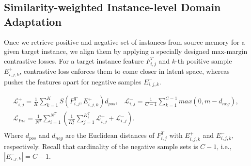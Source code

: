 \documentclass{bmvc2k}
\begin{document}
\subsection{Similarity-weighted Instance-level Domain Adaptation} \label{sec:alignment}
Once we retrieve positive and negative set of instances from source memory for a given target instance, we align them by applying a specially designed max-margin contrastive losses. 
For a target instance feature $F_{i,j}^{T}$ and $k$-th positive sample $E^{+}_{i,j,k}$, contrastive loss enforces them to come closer in latent space, whereas pushes the features apart for negative samples $E^{-}_{i,j,k}$.

\begin{equation}
\begin{gathered}
\mathcal{L}^{+}_{i,j} =\frac{1}{K}\sum_{k=1}^{K}S(F^T_{i,j}, E^+_{i,j,k})d_{pos}, \hspace{10pt}
\mathcal{L}^{-}_{i,j} = \frac{1}{C-1}\sum_{k=1}^{C-1}max(0, m - d_{neg}),\\
\mathcal{L}_{Ins} = \frac{1}{N^T}\sum_{i=1}^{N^T} \left( \frac{1}{K^T_i} \sum_{j=1}^{K^T_i}\mathcal{L}^{+}_{i,j} + \mathcal{L}^{-}_{i,j} \right). \\
\label{eqn:contrastive loss}
\end{gathered}
\end{equation}
Where $d_{pos}$ and $d_{neg}$ are the Euclidean distances of $F_{i,j}^{T}$ with $E^{+}_{i,j,k}$ and $E^{-}_{i,j,k}$, respectively. Recall that cardinality of the negative sample sets is $C-1$, i.e., $|E^{-}_{i,j,k}|=C-1$.
\end{document}
